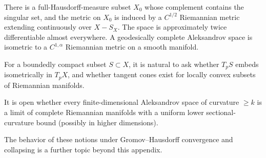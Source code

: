 \begin{theorem}
\label{thm:chow-iii-g60-regularity}
There is a full-Hausdorff-measure subset $X_0$ whose complement contains the
singular set, and the metric on $X_0$ is induced by a $C^{1/2}$ Riemannian
metric extending continuously over $X-S_X$.  The space is approximately twice
differentiable almost everywhere.  A geodesically complete Aleksandrov space
is isometric to a $C^{1,\alpha}$ Riemannian metric on a smooth manifold.
\end{theorem}

\begin{remark}
\label{rem:chow-iii-g21-g22-tangent-questions}
For a boundedly compact subset $S\subset X$, it is natural to ask whether
$T_pS$ embeds isometrically in $T_pX$, and whether tangent cones exist for
locally convex subsets of Riemannian manifolds.
\end{remark}

\begin{remark}
\label{rem:chow-iii-g48-riemannian-limits}
It is open whether every finite-dimensional Aleksandrov space of curvature
$\geq k$ is a limit of complete Riemannian manifolds with a uniform lower
sectional-curvature bound (possibly in higher dimensions).
\end{remark}

\begin{remark}
\label{rem:chow-iii-g61-further-convergence}
The behavior of these notions under Gromov--Hausdorff convergence and collapsing
is a further topic beyond this appendix.
\end{remark}
